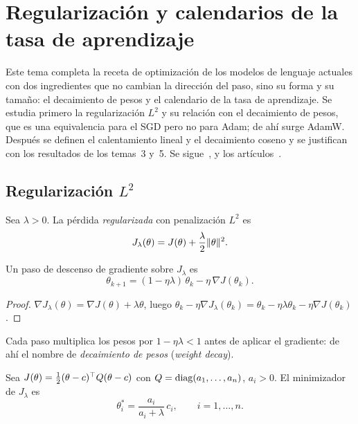 \chapter{Regularización y calendarios de la tasa de aprendizaje}
\label{tema:6}

Este tema completa la receta de optimización de los modelos de lenguaje actuales con dos ingredientes que no cambian la dirección del paso, sino su forma y su tamaño: el decaimiento de pesos y el calendario de la tasa de aprendizaje. Se estudia primero la regularización $L^{2}$ y su relación con el decaimiento de pesos, que es una equivalencia para el SGD pero no para Adam; de ahí surge AdamW. Después se definen el calentamiento lineal y el decaimiento coseno y se justifican con los resultados de los temas~3 y~5. Se sigue~\cite[§7.1]{gbc}, \cite[§12.11]{d2l} y los artículos~\cite{adamw,sgdr,goyal}.

\section{Regularización \texorpdfstring{$L^{2}$}{L2}}

\begin{definicion}[Regularización $L^{2}$]\label{def:l2}
Sea $\lambda>0$. La pérdida \emph{regularizada} con penalización $L^{2}$ es
\[
J_\lambda(\theta)=J(\theta)+\frac{\lambda}{2}\lVert\theta\rVert^{2}.
\]
\end{definicion}

\begin{proposicion}[Encogimiento]\label{prop:encogimiento}
Un paso de descenso de gradiente sobre $J_\lambda$ es
\[
\theta_{k+1}=(1-\eta\lambda)\,\theta_k-\eta\,\nabla J(\theta_k).
\]
\end{proposicion}

\begin{proof}
$\nabla J_\lambda(\theta)=\nabla J(\theta)+\lambda\theta$, luego $\theta_k-\eta\nabla J_\lambda(\theta_k)=\theta_k-\eta\lambda\theta_k-\eta\nabla J(\theta_k)$.
\end{proof}

Cada paso multiplica los pesos por $1-\eta\lambda<1$ antes de aplicar el gradiente: de ahí el nombre de \emph{decaimiento de pesos} (\emph{weight decay}).

\begin{proposicion}\label{prop:ridge}
Sea $J(\theta)=\frac12(\theta-c)^{\top} Q(\theta-c)$ con $Q=\operatorname{diag}(a_1,\dots,a_n)$, $a_i>0$. El minimizador de $J_\lambda$ es
\[
\theta^{\ast}_i=\frac{a_i}{a_i+\lambda}\,c_i,\qquad i=1,\dots,n.
\]
\end{proposicion}

